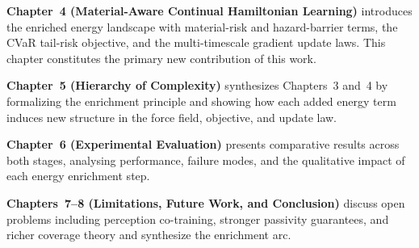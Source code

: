 \textbf{Chapter~4 (Material-Aware Continual Hamiltonian Learning)}
introduces the enriched energy landscape with material-risk and
hazard-barrier terms, the CVaR tail-risk objective, and the
multi-timescale gradient update laws.
This chapter constitutes the primary new contribution of this work.

\textbf{Chapter~5 (Hierarchy of Complexity)} synthesizes Chapters~3
and~4 by formalizing the enrichment principle and showing how each
added energy term induces new structure in the force field, objective,
and update law.

\textbf{Chapter~6 (Experimental Evaluation)} presents comparative
results across both stages, analysing performance, failure modes, and
the qualitative impact of each energy enrichment step.

\textbf{Chapters~7--8 (Limitations, Future Work, and Conclusion)}
discuss open problems including perception co-training, stronger
passivity guarantees, and richer coverage theory and synthesize the
enrichment arc.